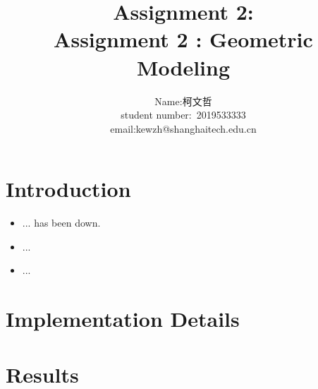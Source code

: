\documentclass[acmtog]{acmart}
\title{Assignment 2:\\ {Assignment 2 : Geometric Modeling}}
\author{Name:\quad 柯文哲  \\ student number:\ 2019533333
\\email:\quad kewzh@shanghaitech.edu.cn}
\begin{document}
\maketitle

\vspace*{2 ex}

\section{Introduction}
\begin{itemize}
\item ... has been down.
\item ...
\item ...
\end{itemize}
\section{Implementation Details}

\section{Results}
\\
\end{document}

